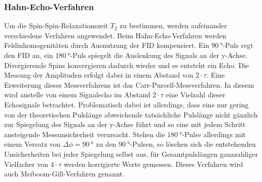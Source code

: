 \subsubsection{Hahn-Echo-Verfahren}
\noindent Um die Spin-Spin-Relaxationszeit $T_2$ zu bestimmen, werden
aufeinander verschiedene Verfahren angewendet. Beim Hahn-Echo-Verfahren werden
Feldinhomogenitäten durch Ausnutzung der FID kompensiert. Ein $\SI{90}{\degree}$-Puls regt den
FID an, ein $\SI{180}{\degree}$-Puls spiegelt die Auslenkung des Signals an der y-Achse.
Divergierende Spins konvergieren dadurch wieder und es entsteht ein Echo. Die
Messung der Amplituden erfolgt dabei in einem Abstand von $2 \cdot \tau$. Eine
Erweiterung dieses Messverfahrens ist das Carr-Purcell-Messverfahren. In diesem
wird anstelle von einem Signalecho im Abstand $2 \cdot \tau$ eine Vielzahl
dieser Echosignale betrachtet. Problematisch dabei ist allerdings, dass eine
nur gering von der theoretischen Pulslänge abweichende tatsächliche
Pulslänge nicht gänzlich zur Spiegelung des Signals an der y-Achse führt und
so eine mit jedem Schritt ansteigende Messunsicherheit verursacht. Stehen die
$\SI{180}{\degree}$-Pulse allerdings mit einem Versatz von $\Delta \phi = \SI{90}{\degree}$ zu den
$\SI{90}{\degree}$-Pulsen, so löschen sich die entstehenden Unsicherheiten bei jeder Spiegelung
selbst aus, für Gesamtpulslängen ganzzahliger Vielfacher von $4 \cdot \tau$
werden korrigierte Werte gemessen. Dieses Verfahren wird auch
Meiboom-Gill-Verfahren genannt. \\
